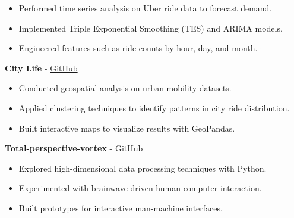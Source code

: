 \documentclass[a4paper,11pt]{article}%
\begin{document}
\begin{itemize}[leftmargin=2em,label={},parsep=0pt,topsep=1em]%
\item Performed time series analysis on Uber ride data to forecast demand.%
\item Implemented Triple Exponential Smoothing (TES) and ARIMA models.%
\item Engineered features such as ride counts by hour, day, and month.%
\end{itemize}%
%
\noindent \textbf{City Life} - \href{https://github.com/sboof911/City-Life}{GitHub}%
\begin{itemize}[leftmargin=2em,label={},parsep=0pt,topsep=1em]%
\item Conducted geospatial analysis on urban mobility datasets.%
\item Applied clustering techniques to identify patterns in city ride distribution.%
\item Built interactive maps to visualize results with GeoPandas.%
\end{itemize}%
%
\noindent \textbf{Total-perspective-vortex} - \href{https://github.com/sboof911/total-perspectivevortex}{GitHub}%
\begin{itemize}[leftmargin=2em,label={},parsep=0pt,topsep=1em]%
\item Explored high-dimensional data processing techniques with Python.%
\item Experimented with brainwave-driven human-computer interaction.%
\item Built prototypes for interactive man-machine interfaces.%
\end{itemize}%
\end{document}

